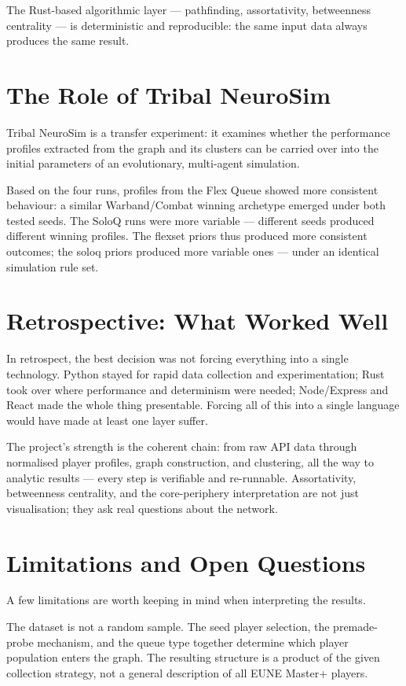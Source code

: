 The Rust-based algorithmic layer --- pathfinding, assortativity, betweenness centrality --- is deterministic and reproducible: the same input data always produces the same result.

\section{The Role of Tribal NeuroSim}

Tribal NeuroSim is a transfer experiment: it examines whether the performance profiles extracted from the graph and its clusters can be carried over into the initial parameters of an evolutionary, multi-agent simulation.

Based on the four runs, profiles from the Flex Queue showed more consistent behaviour: a similar Warband/Combat winning archetype emerged under both tested seeds. The SoloQ runs were more variable --- different seeds produced different winning profiles. The flexset priors thus produced more consistent outcomes; the soloq priors produced more variable ones --- under an identical simulation rule set.

\section{Retrospective: What Worked Well}

In retrospect, the best decision was not forcing everything into a single technology. Python stayed for rapid data collection and experimentation; Rust took over where performance and determinism were needed; Node/Express and React made the whole thing presentable. Forcing all of this into a single language would have made at least one layer suffer.

The project's strength is the coherent chain: from raw API data through normalised player profiles, graph construction, and clustering, all the way to analytic results --- every step is verifiable and re-runnable. Assortativity, betweenness centrality, and the core-periphery interpretation are not just visualisation; they ask real questions about the network.

\section{Limitations and Open Questions}

A few limitations are worth keeping in mind when interpreting the results.

The dataset is not a random sample. The seed player selection, the premade-probe mechanism, and the queue type together determine which player population enters the graph. The resulting structure is a product of the given collection strategy, not a general description of all EUNE Master+ players.

